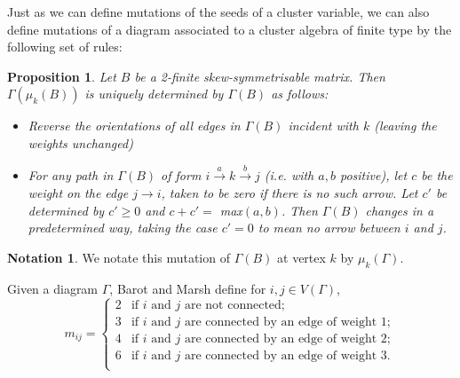 \documentclass[11pt]{amsart}
\newtheorem{prop}[thm]{Proposition}
\theoremstyle{definition}
\newtheorem{note}[thm]{Notation}
\newcommand\V{V(\Gamma)}
\begin{document}
Just as we can define mutations of the seeds of a cluster variable, we can also define mutations of a diagram associated to a cluster algebra of finite type by the following set of rules:
\begin{prop}\cite[Proposition 1.4]{BM13}
Let $B$ be a 2-finite skew-symmetrisable matrix. Then $\Gamma(\mu_k(B))$ is uniquely determined by $\Gamma(B)$ as follows: 
\begin{itemize}
\item Reverse the orientations of all edges in $\Gamma(B)$ incident with $k$ (leaving the weights unchanged)
\item For any path in $\Gamma(B)$ of form $i \xrightarrow{a} k \xrightarrow{b} j$ (i.e. with $a,b$ positive), let $c$ be the weight on the edge $j \rightarrow i$, taken to be zero if there is no such arrow. Let $c'$ be determined by $c'\geq 0$ and 
$c+c' =$ max$(a,b)$. 
Then $\Gamma(B)$ changes in a predetermined way,  taking the case $c' = 0$ to mean no arrow between $i$ and $j$.
\end{itemize}
\end{prop}

\begin{note}
We notate this mutation of $\Gamma(B)$ at vertex $k$ by $\mu_k(\Gamma)$. \\
\end{note}


\indent Given a diagram $\Gamma$, Barot and Marsh define for $i, j \in \V$,
\begin{displaymath}
\label{mij_defn}
m_{ij} = \begin{cases}    2 & \mbox{if } i \mbox{ and } j \mbox{ are not connected;} \\
																	3 & \mbox{if } i \mbox{ and } j \mbox{ are connected by an edge of weight } 1;\\
																	4 & \mbox{if } i \mbox{ and } j \mbox{ are connected by an edge of weight } 2;\\
																	6 & \mbox{if } i \mbox{ and } j \mbox{ are connected by an edge of weight } 3.\\
					\end{cases}
\end{displaymath}	
\end{document}
